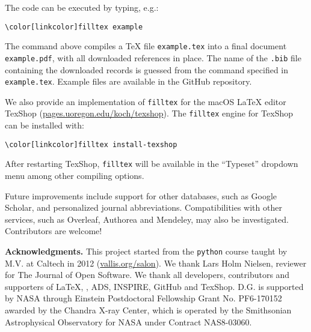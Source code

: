 \documentclass[floats,floatfix,showpacs,amssymb,prd,twocolumn,superscriptaddress,nofootinbib]{revtex4-1}
\newcommand{\filltex}{\texttt{filltex}\xspace}
\newcommand{\latex}{\LaTeX\xspace}
\newcommand{\tex}{\TeX\xspace}
\newcommand{\bibtex}{\hologo{BibTeX}\xspace}
\begin{document}
The code can be executed by typing, e.g.:
\vspace{-0.1cm}
\begin{Verbatim}[fontsize=\normalsize,commandchars=\\\[\]]
\color[linkcolor]filltex example
\end{Verbatim}
\vspace{-0.1cm}
The command above compiles a \tex file \texttt{example.tex} into  a final document \texttt{example.pdf}, with all downloaded references in place. The name of the \texttt{.bib} file containing the downloaded records is guessed from the \verb|| command specified in \texttt{example.tex}. Example files are available in the GitHub repository.

We also provide an implementation of \filltex for the macOS \latex editor TexShop (\href{http://pages.uoregon.edu/koch/texshop/}{pages.uoregon.edu/koch/texshop}). The \filltex  engine for TexShop can be installed with:
\vspace{-0.1cm}
\begin{Verbatim}[fontsize=\normalsize,commandchars=\\\[\]]
\color[linkcolor]filltex install-texshop
\end{Verbatim}
\vspace{-0.1cm}
After restarting TexShop, \filltex will be available in the ``Typeset'' dropdown menu among other compiling options.

Future improvements include support for other databases, such as Google Scholar, and personalized journal abbreviations. Compatibilities with other services, such as Overleaf, Authorea and Mendeley, may also be investigated. Contributors are welcome!


\vspace{0.2cm}
\textbf{{Acknowledgments.}}
This project started from the \texttt{python} course taught by M.V. at Caltech in 2012 (\href{http://www.vallis.org/salon/}{vallis.org/salon}). We thank Lars Holm Nielsen, reviewer for The Journal of Open Software. We thank all developers, contributors and supporters of \latex, \bibtex, ADS, INSPIRE, GitHub and TexShop. D.G. is supported by NASA through Einstein Postdoctoral Fellowship Grant No. PF6-170152 awarded by the Chandra X-ray Center, which is operated by the Smithsonian Astrophysical Observatory for NASA under Contract NAS8-03060. 

%
\end{document}

